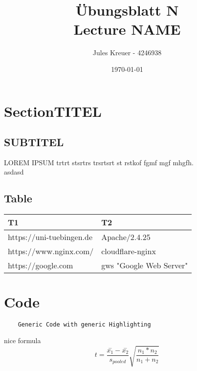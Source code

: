 \documentclass[a4paper]{article}
\begin{document}
\author{Jules Kreuer - 4246938} %
\title{\vspace{-2cm}Übungsblatt N \\
	Lecture NAME}
\date{\today{}} %
\maketitle{} %

\section{SectionTITEL}
\subsection{SUBTITEL}
LOREM IPSUM trtrt stsrtrs trsrtsrt st rstkof fgmf mgf mhgfh.\\
asdasd
\subsection{Table}
 \begin{tabular}{|l|l|}
 	\hline
	T1 & T2\\
	\hline
	https://uni-tuebingen.de &  Apache/2.4.25 \\
	\hline
	https://www.nginx.com/ & cloudflare-nginx \\
	\hline
	https://google.com & gws "Google Web Server" \\
	\hline
\end{tabular}
\newpage
\section{Code}
\begin{verbatim}
	Generic Code with generic Highlighting
\end{verbatim}
nice formula
\[
	t = \frac{\overset{-}{x_1} - \overset{-}{x_2}}{s_{pooled}}\sqrt{\frac{n_1 * n_2}{n_1 + n_2}}
\]
\end{document}
